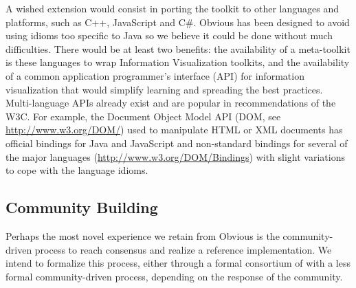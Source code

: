 A wished extension would consist in porting the toolkit to other
languages and platforms, such as C++, JavaScript and C\#.  Obvious has
been designed to avoid using idioms too specific to Java so we believe
it could be done without much difficulties.  There would be at least
two benefits: the availability of a meta-toolkit is these languages to
wrap Information Visualization toolkits, and the availability of a
common application programmer's interface (API) for information
visualization that would simplify learning and spreading the best
practices.  Multi-language APIs already exist and are popular in
recommendations of the W3C. For example, the Document Object Model API
(DOM, see \url{http://www.w3.org/DOM/}) used to manipulate HTML or XML
documents has official bindings for Java and JavaScript and
non-standard bindings for several of the major languages
(\url{http://www.w3.org/DOM/Bindings}) with slight variations to cope
with the language idioms.

\begin{comment}
This
endeavor raises some new challenges: each language and platforms
supposes some specific idioms that are hardly translatable in concepts
of the other languages. Java has a generic collection type, for
instance, that does not map to a standard equivalent in C++. In
translating the design verbatim from a language to another, we would
insure some level of compatibility, but at the expense of
idiosyncrasies in our library, which would preclude widespread
adoption in our target languages. Conversely, adopting the target
language's idioms would preclude interoperability of the Obvious
platform across languages.
\end{comment}

\subsection{Community Building}

Perhaps the most novel experience we retain from Obvious is the
community-driven process to reach consensus and realize a reference
implementation.  We intend to formalize this process, either through a
formal consortium of with a less formal community-driven process,
depending on the response of the community.

